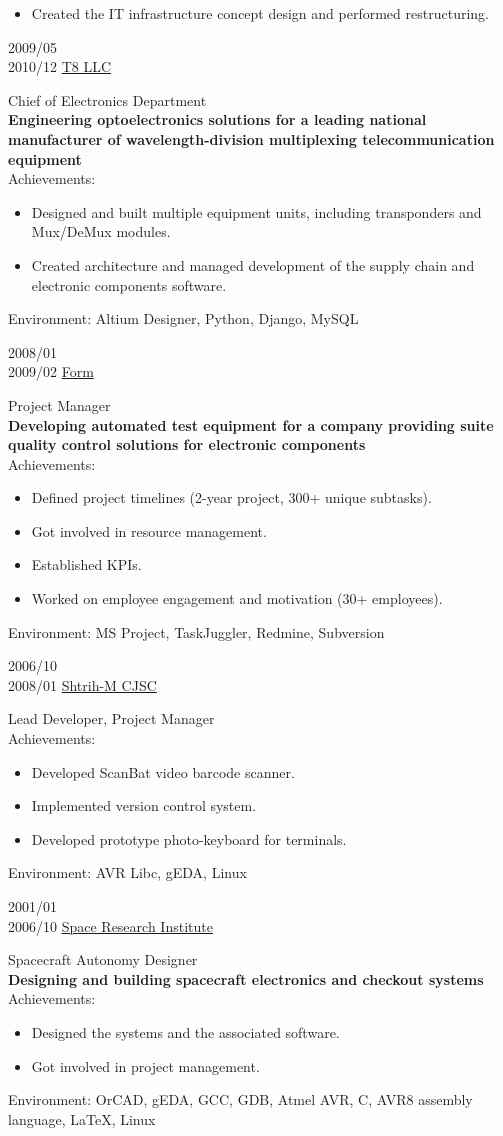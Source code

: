 \begin{entrylist}
{\begin{itemize}
\item Created the IT infrastructure concept design and performed restructuring.
\end{itemize}}
\entry
{2009/05\\2010/12}
{\href{https://t8.ru/en/}{T8 LLC}}
{}
{Chief of Electronics Department\\
\textbf{Engineering optoelectronics solutions for a leading national manufacturer of wavelength-division multiplexing telecommunication equipment}\\
Achievements:
\begin{itemize}
\item Designed and built multiple equipment units, including transponders and Mux/DeMux modules.
\item Created architecture and managed development of the supply chain and electronic components software.
\end{itemize}
Environment: Altium Designer, Python, Django, MySQL}
\entry
{2008/01\\2009/02}
{\href{https://form.ru}{Form}}
{}
{Project Manager\\
\textbf{Developing automated test equipment for a company providing suite quality control solutions for electronic components}\\
Achievements:
\begin{itemize}
\item Defined project timelines (2-year project, 300+ unique subtasks).
\item Got involved in resource management.
\item Established KPIs.
\item Worked on employee engagement and motivation (30+ employees).
\end{itemize}
Environment: MS Project, TaskJuggler, Redmine, Subversion}
\entry
{2006/10\\2008/01}
{\href{https://trade.shtrih-m.ru/}{Shtrih-M CJSC}}
{}
{Lead Developer, Project Manager\\
Achievements:
\begin{itemize}
\item Developed ScanBat video barcode scanner.
\item Implemented version control system.
\item Developed prototype photo-keyboard for terminals.
\end{itemize}
Environment: AVR Libc, gEDA, Linux}
\entry
{2001/01\\2006/10}
{\href{https://iki.cosmos.ru/en}{Space Research Institute}}
{}
{Spacecraft Autonomy Designer\\
\textbf{Designing and building spacecraft electronics and checkout systems}\\
Achievements:
\begin{itemize}
\item Designed the systems and the associated software.
\item Got involved in project management.
\end{itemize}
Environment: OrCAD, gEDA, GCC, GDB, Atmel AVR, C, AVR8 assembly language, LaTeX, Linux}
\end{entrylist}